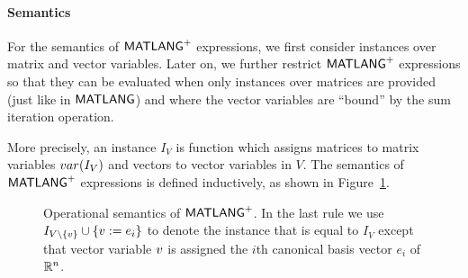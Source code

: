 \paragraph{Semantics} For the semantics of $\mathsf{MATLANG}^{\sf +}$ expressions, we first consider instances over matrix and vector variables. Later on, we further restrict
$\mathsf{MATLANG}^{\sf +}$ expressions so that they can be evaluated when only instances over matrices are provided (just like in $\mathsf{MATLANG}$) and where
the vector variables are ``bound'' by the sum iteration operation.

More precisely,
an instance $I_V$ is function which assigns  matrices to matrix variables $var(I_V)$ and vectors to vector variables in $V$.
The semantics of $\mathsf{MATLANG}^{\sf +}$ expressions is defined inductively, as shown in Figure~\ref{fig:semantics}.
\begin{figure}
\caption{Operational semantics of $\mathsf{MATLANG}^{\sf +}$. In the last rule we use $I_{V\setminus \{v\}}\cup\{v:=e_i\}$ to denote the instance that is equal to $I_V$ except that vector variable $v$ is assigned the $i$th canonical basis vector $e_i$ of $\mathbb{R}^n$.
}\label{fig:semantics}
\end{figure}



